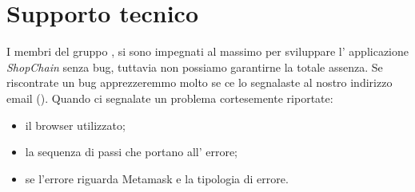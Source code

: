 \section{Supporto tecnico}\label{section:supporto_tecnico}
I membri del gruppo \groupName{}, si sono impegnati al massimo per sviluppare l' applicazione \textit{ShopChain} senza bug, tuttavia non possiamo garantirne la totale assenza.
Se riscontrate un bug apprezzeremmo molto se ce lo segnalaste al nostro indirizzo email (\groupEmail{}).
Quando ci segnalate un problema cortesemente riportate:
\begin{itemize}
    \item il browser utilizzato;
    \item la sequenza di passi che portano all' errore;
    \item se l'errore riguarda Metamask\glo{} e la tipologia di errore.
\end{itemize}
